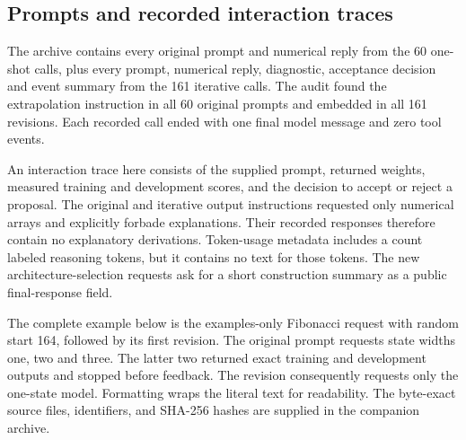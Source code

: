 \subsection{Prompts and recorded interaction traces}\label{app:prompts}
The archive contains every original prompt and numerical reply from the 60 one-shot calls, plus every prompt, numerical reply, diagnostic, acceptance decision and event summary from the 161 iterative calls. The audit found the extrapolation instruction in all 60 original prompts and embedded in all 161 revisions. Each recorded call ended with one final model message and zero tool events.

An interaction trace here consists of the supplied prompt, returned weights, measured training and development scores, and the decision to accept or reject a proposal. The original and iterative output instructions requested only numerical arrays and explicitly forbade explanations. Their recorded responses therefore contain no explanatory derivations. Token-usage metadata includes a count labeled reasoning tokens, but it contains no text for those tokens. The new architecture-selection requests ask for a short construction summary as a public final-response field.

The complete example below is the examples-only Fibonacci request with random start 164, followed by its first revision. The original prompt requests state widths one, two and three. The latter two returned exact training and development outputs and stopped before feedback. The revision consequently requests only the one-state model. Formatting wraps the literal text for readability. The byte-exact source files, identifiers, and SHA-256 hashes are supplied in the companion archive.


